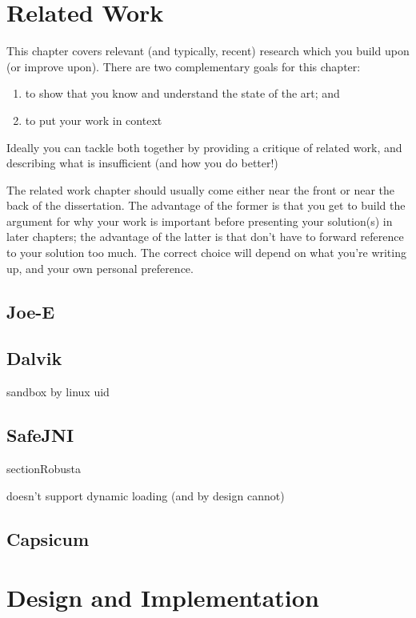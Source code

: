 \documentclass[a4paper,12pt,twoside,openright]{report}
\begin{document}
\chapter{Related Work} 

This chapter covers relevant (and typically, recent) research 
which you build upon (or improve upon). There are two complementary 
goals for this chapter: 
\begin{enumerate} 
  \item to show that you know and understand the state of the art; and 
  \item to put your work in context
\end{enumerate} 

Ideally you can tackle both together by providing a critique of
related work, and describing what is insufficient (and how you do
better!)

The related work chapter should usually come either near the front or
near the back of the dissertation. The advantage of the former is that
you get to build the argument for why your work is important before
presenting your solution(s) in later chapters; the advantage of the
latter is that don't have to forward reference to your solution too
much. The correct choice will depend on what you're writing up, and
your own personal preference.

\section{Joe-E}

\section{Dalvik}

sandbox by linux uid

\section{SafeJNI}

section{Robusta}

doesn't support dynamic loading (and by design cannot)

\section{Capsicum}

\chapter{Design and Implementation} 
\end{document}
